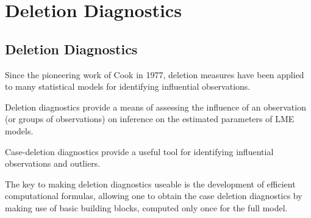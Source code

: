 \documentclass[12pt, a4paper]{report}
\theoremstyle{plain}
\theoremstyle{definition}
\theoremstyle{remark}
\begin{document}
%
%
%







\chapter{Deletion Diagnostics}

\section{Deletion Diagnostics}

Since the pioneering work of Cook in 1977, deletion measures have been applied to many statistical models for identifying influential observations.

Deletion diagnostics provide a means of assessing the influence of an observation (or groups of observations) on inference on the estimated parameters of LME models.

Case-deletion diagnostics provide a useful tool for identifying influential observations and outliers.


The key to making deletion diagnostics useable is the development of efficient computational formulas, allowing one to obtain the  case deletion diagnostics by making use of basic building blocks, computed only once for the full model.
\end{document}
